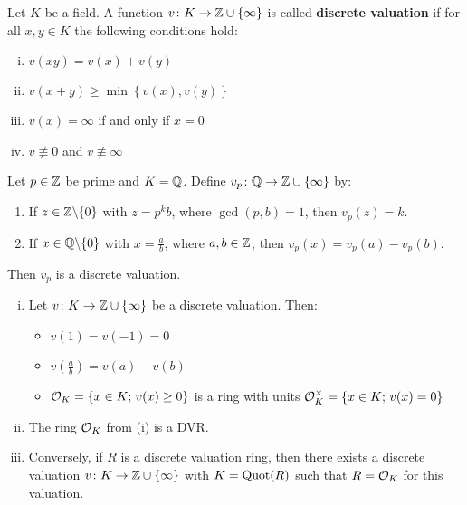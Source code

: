 \begin{defi}
Let $K$ be a field. A function $v \colon K \to \mathbb{Z} \cup \{\infty\}$ is called \textbf{discrete valuation} if for all $x,y \in K$ the following conditions hold:
\begin{enumerate}[(i)]
	\item $v(xy) =v(x) +v(y)$
	\item $v(x+y) \geq \min \left\{ v(x), v(y) \right\}$
	\item $v(x) = \infty$ if and only if $x = 0$
	\item $v \not\equiv 0$ and $v \not \equiv \infty$
\end{enumerate}
\end{defi}

\begin{Bsp}
Let $p \in \mathbb{Z}$ be prime and $K = \mathbb{Q}$. Define $v_p \colon \mathbb{Q} \to \mathbb{Z} \cup \{\infty\}$ by:
\begin{enumerate}[(1)]
	\item If $z \in \mathbb{Z} \backslash \{0\}$ with $z =p^k b$, where $\gcd(p,b) =1$, then $v_p(z) = k$.
	\item If $x \in \mathbb{Q} \backslash \{0\}$ with $x = \frac{a}{b}$, where $a,b \in \mathbb{Z}$, then $v_p(x) = v_p(a) -v_p(b)$.
\end{enumerate}
Then $v_p$ is a discrete valuation.
\end{Bsp}


\begin{Prop} 
	\begin{enumerate}[(i)] 
		\item Let $v \colon K \to \mathbb{Z} \cup \{\infty\}$ be a discrete valuation. Then:
				\begin{itemize}
					\item $v(1) = v(-1) = 0$
					\item $v \left( \frac{a}{b} \right) = v(a) -v(b)$
					\item $\mathcal{O}_K = \left\{ x \in K; \, v(x) \geq 0  \right\}$ is a ring with units
							$\mathcal{O}_K^\times = \left\{ x \in K; \, v(x) = 0  \right\}$ 
				\end{itemize}
		\item The ring $\mathcal{O}_K$ from (i) is a DVR.
		\item Conversely, if $R$ is a discrete valuation ring, then there exists a discrete valuation 
				$v \colon K \to \mathbb{Z} \cup \{\infty\}$ with $K= \operatorname{Quot}(R)$ such that $R= \mathcal{O}_K$ for this valuation.
	\end{enumerate}
\end{Prop}

